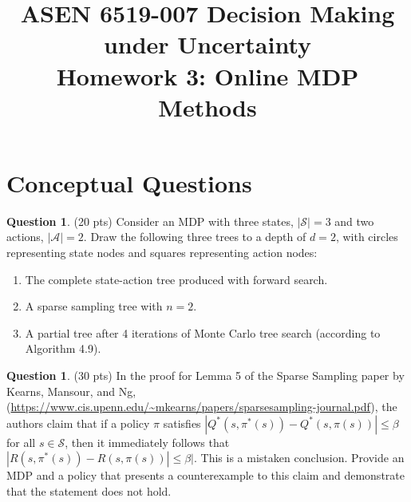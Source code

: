 \documentclass{article}
\title{ASEN 6519-007 Decision Making under Uncertainty\\
       Homework 3: Online MDP Methods}
\theoremstyle{definition}
\newtheorem{question}[thm]{Question}
\begin{document}
\maketitle

\section{Conceptual Questions}


\begin{question}
    (20 pts) Consider an MDP with three states, $|\mathcal{S}| = 3$ and two actions, $|\mathcal{A}| = 2$. Draw the following three trees to a depth of $d=2$, with circles representing state nodes and squares representing action nodes:
    \begin{enumerate}[label=(\alph*)]
        \item The complete state-action tree produced with forward search.
        \item A sparse sampling tree with $n=2$.
        \item A partial tree after 4 iterations of Monte Carlo tree search (according to Algorithm 4.9).
    \end{enumerate}

\end{question}

\begin{question}
    (30 pts) In the proof for Lemma 5 of the Sparse Sampling paper by Kearns, Mansour, and Ng, (\url{https://www.cis.upenn.edu/~mkearns/papers/sparsesampling-journal.pdf}), the authors claim that if a policy $\pi$ satisfies $|Q^*(s, \pi^*(s)) - Q^*(s, \pi(s))| \leq \beta$ for all $s \in \mathcal{S}$, then it immediately follows that $|R(s, \pi^*(s)) - R(s, \pi(s))| \leq \beta|$. This is a mistaken conclusion. Provide an MDP and a policy that presents a counterexample to this claim and demonstrate that the statement does not hold.
\end{question}
\end{document}
